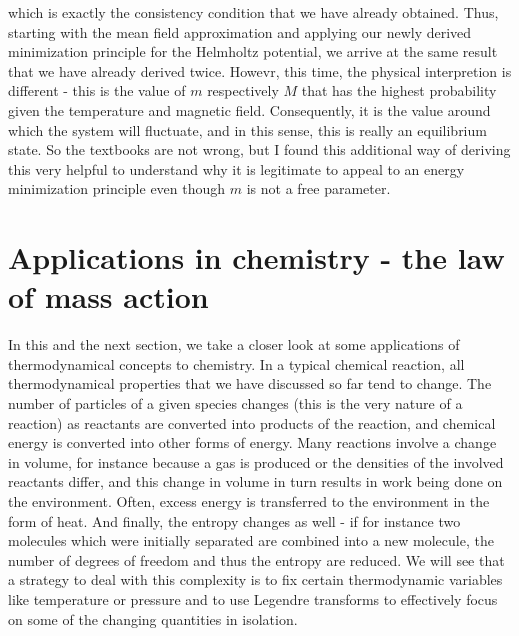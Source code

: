\documentclass[a4paper, draft]{article}
\theoremstyle{own}
\theoremstyle{remark}
\begin{document}
which is exactly the consistency condition that we have already obtained. Thus, starting with the mean field approximation and applying our newly derived minimization principle for the Helmholtz potential, we arrive at the same result that we have already derived twice. Howevr, this time, the physical interpretion is different - this is the value of $m$ respectively $M$ that has the highest probability given the temperature and magnetic field. Consequently, it is the value around which the system will fluctuate, and in this sense, this is really an equilibrium state. So the textbooks are not wrong, but I found this additional way of deriving this very helpful to understand why it is legitimate to appeal to an energy minimization principle even though $m$ is not a free parameter.


\section{Applications in chemistry - the law of mass action}

In this and the next section, we take a closer look at some applications of thermodynamical concepts to chemistry. In a typical chemical reaction, all thermodynamical properties that we have discussed so far tend to change. The number of particles of a given species changes (this is the very nature of a reaction) as reactants are converted into products of the reaction, and chemical energy is converted into other forms of energy. Many reactions involve a change in volume, for instance because a gas is produced or the densities of the involved reactants differ, and this change in volume in turn results in work being done on the environment. Often, excess energy is transferred to the environment in the form of heat. And finally, the entropy changes as well - if for instance two molecules which were initially separated are combined into a new molecule, the number of degrees of freedom and thus the entropy are reduced. We will see that a strategy to deal with this complexity is to fix certain thermodynamic variables like temperature or pressure and to use Legendre transforms to effectively focus on some of the changing quantities in isolation.
\end{document}
